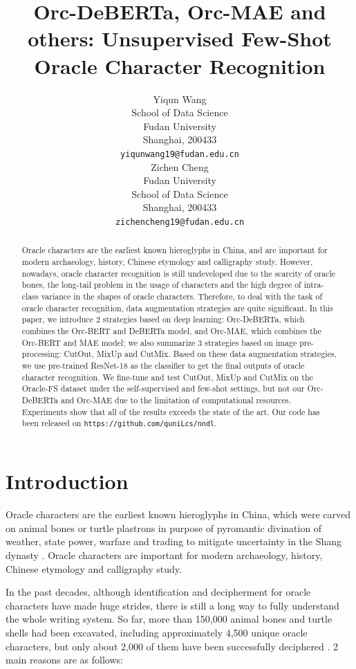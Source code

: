 \documentclass{article}
\title{Orc-DeBERTa, Orc-MAE and others: Unsupervised Few-Shot Oracle Character Recognition}
\author{
  Yiqun Wang \\
  School of Data Science \\
  Fudan University \\
  Shanghai, 200433 \\
  \texttt{yiqunwang19@fudan.edu.cn} \\
  \And
  Zichen Cheng \\
  Fudan University \\
  School of Data Science \\
  Shanghai, 200433 \\
  \texttt{zichencheng19@fudan.edu.cn} \\
}
\begin{document}
\maketitle

\begin{abstract}
Oracle characters are the earliest known hieroglyphs in China, and are important for modern archaeology, history, Chinese etymology and calligraphy study. However, nowadays, oracle character recognition is still undeveloped due to the scarcity of oracle bones, the long-tail problem in the usage of characters and the high degree of intra-class variance in the shapes of oracle characters.
Therefore, to deal with the task of oracle character recognition, data augmentation strategies are quite significant. In this paper, we introduce 2 strategies based on deep learning: Orc-DeBERTa, which combines the Orc-BERT and DeBERTa model, and Orc-MAE, which combines the Orc-BERT and MAE model; we also summarize 3 strategies based on image pre-processing: CutOut, MixUp and CutMix. Based on these data augmentation strategies, we use pre-trained ResNet-18 as the classifier to get the final outputs of oracle character recognition.
We fine-tune and test CutOut, MixUp and CutMix on the Oracle-FS dataset under the self-supervised and few-shot settings, but not our Orc-DeBERTa and Orc-MAE due to the limitation of computational resources. Experiments show that all of the results exceeds the state of the art. Our code has been released on \verb|https://github.com/quniLcs/nndl|.
\end{abstract}

\section{Introduction}

Oracle characters are the earliest known hieroglyphs in China, which were carved on animal bones or turtle plastrons in purpose of pyromantic divination of weather, state power, warfare and trading to mitigate uncertainty in the Shang dynasty \citep{Oracle}. Oracle characters are important for modern archaeology, history, Chinese etymology and calligraphy study. \citep{Hierachical, Neighbor}

In the past decades, although identification and decipherment for oracle characters have made huge strides, there is still a long way to fully understand the whole writing system. 
So far, more than 150,000 animal bones and turtle shells had been excavated, including approximately 4,500 unique oracle characters, but only about 2,000 of them have been successfully deciphered \citep{OBC306}.
2 main reasons are as follows:
\end{document}
